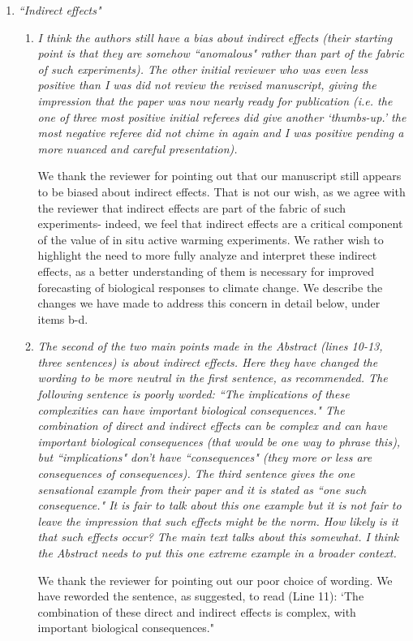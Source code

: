 \documentclass[11pt,a4paper]{letter}
\begin{document}
\begin{letter}{}
\begin{enumerate}
\begin{enumerate}
\end{enumerate}
\item \emph{``Indirect effects"}
\begin{enumerate}
\item \emph{ I think the authors still have a bias about indirect effects (their starting
point is that they are somehow ``anomalous" rather than part of the
fabric of such experiments). The other initial reviewer who was even
less positive than I was did not review the revised manuscript, giving the
impression that the paper was now nearly ready for publication (i.e. the
one of three most positive initial referees did give another `thumbs-up.'
the most negative referee did not chime in again and I was positive
pending a more nuanced and careful presentation).}
\par We thank the reviewer for pointing out that our manuscript still appears to be biased about indirect effects. That is not our wish, as we agree with the reviewer that indirect effects are part of the fabric of such experiments- indeed, we feel that indirect effects are a critical component of the value of in situ active  warming experiments. 
We rather wish to highlight the need to more fully analyze and interpret these indirect effects, as a better understanding of them is necessary for improved forecasting of biological responses to climate change. We describe the changes we have made to address this concern in detail below, under items b-d.
\item \emph{The second of the two main points made in the Abstract (lines 10-13,
three sentences) is about indirect effects. Here they have changed the
wording to be more neutral in the first sentence, as recommended. The
following sentence is poorly worded: ``The implications of these
complexities can have important biological consequences." The
combination of direct and indirect effects can be complex and can have
important biological consequences (that would be one way to phrase
this), but ``implications" don't have ``consequences" (they more or less
are consequences of consequences). The third sentence gives the one
sensational example from their paper and it is stated as ``one such
consequence." It is fair to talk about this one example but it is not fair to
leave the impression that such effects might be the norm. How likely is
it that such effects occur? The main text talks about this somewhat. I
think the Abstract needs to put this one extreme example in a broader
context.}
\par We thank the reviewer for pointing out our poor choice of wording. We have reworded the sentence, as suggested, to read (Line 11): `The combination of these direct and indirect effects is complex, with important biological consequences."

\end{enumerate}
\end{enumerate}
\end{letter}
\end{document}
